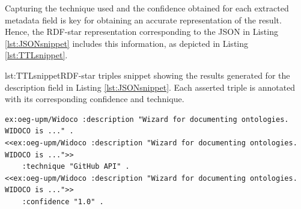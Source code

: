 Capturing the technique used and the confidence obtained for each extracted metadata field is key for obtaining an accurate representation of the result. Hence, the \mbox{RDF-star} representation corresponding to the JSON in Listing \ref{lst:JSONsnippet} includes this information, as depicted in Listing \ref{lst:TTLsnippet}.



\begin{captionedlisting}{lst:TTLsnippet}{RDF-star triples snippet showing the results generated for the description field in Listing \ref{lst:JSONsnippet}. Each asserted triple is annotated with its corresponding confidence and technique.}
\centering
{
\begin{lstlisting}[basicstyle=\ttfamily\small,label={list:example1},columns=flexible]
ex:oeg-upm/Widoco :description "Wizard for documenting ontologies. WIDOCO is ..." .
<<ex:oeg-upm/Widoco :description "Wizard for documenting ontologies. WIDOCO is ...">> 
    :technique "GitHub API" .
<<ex:oeg-upm/Widoco :description "Wizard for documenting ontologies. WIDOCO is ...">> 
    :confidence "1.0" .
\end{lstlisting}
}
\end{captionedlisting}


